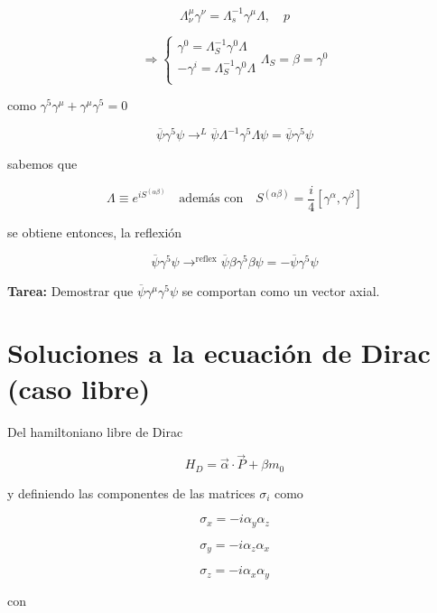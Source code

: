 \documentclass{report}
\begin{document}
\[\Lambda_{\nu}^{\mu} \gamma^{\nu} = \Lambda_{s}^{-1} \gamma^{\mu} \Lambda , \quad p\]

\[ \Rightarrow
  \begin{cases}
    \gamma^0 = \Lambda_{S}^{-1} \gamma^0 \Lambda\\
    -\gamma^i = \Lambda_{S}^{-1} \gamma^0 \Lambda\\
  \end{cases}
  \Lambda_{S} = \beta = \gamma^0 \]

como $\gamma^5 \gamma^{\mu} + \gamma^{\mu} \gamma^{5} = 0$

\[\overline{\psi} \gamma^5 \psi \rightarrow^{L} \overline{\psi} \Lambda^{-1} \gamma^5 \Lambda \psi = \overline{\psi} \gamma^5 \psi \]

sabemos que

\[\Lambda \equiv e^{iS^{(\alpha \beta)}} \quad \text{además con} \quad S^{(\alpha \beta)} = \frac{i}{4} [\gamma^{\alpha}, \gamma^{\beta}]\]

se obtiene entonces, la reflexión

\begin{equation}
\overline{\psi} \gamma^{5} \psi \rightarrow^{\text{reflex}} \overline{\psi} \beta \gamma^5 \beta \psi = - \overline{\psi} \gamma^{5} \psi
\end{equation}

\textbf{Tarea:} Demostrar que $\overline{\psi} \gamma^{\mu} \gamma^{5} \psi$ se comportan como un vector axial.


\chapter{Soluciones a la ecuaci\'on de Dirac (caso libre)}

Del hamiltoniano libre de Dirac

\begin{equation}
H_{D} = \overrightarrow{\alpha} \cdot \overrightarrow{P} + \beta m_0
\end{equation}

y definiendo las componentes de las matrices $\sigma_{i}$ como

\[\sigma_x = -i \alpha_y \alpha_z \]

\[\sigma_y = -i \alpha_z \alpha_x \]

\[\sigma_z = -i \alpha_x \alpha_y \]

con
\end{document}

